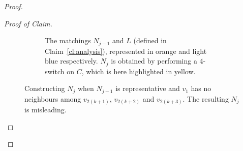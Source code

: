 \documentclass[11pt,a4paper]{article}
\theoremstyle{definition}
\newenvironment{poc}{\begin{proof}[Proof of
    Claim]\renewcommand*{\qedsymbol}{$\blacksquare$}}{\end{proof}}
\begin{document}
\begin{proof}
\begin{poc}
\begin{figure}[ht!]
\begin{subfigure}[t]{.5\linewidth}
        \caption{The matchings $N_{j-1}$ and $L$ (defined in Claim~\ref{cl:analysis}), represented in orange and
          light blue respectively. $N_j$ is obtained by performing a $4$-switch on
          $C$, which is here highlighted in yellow.}  
      \end{subfigure}
      \caption{Constructing $N_{j}$ when $N_{j-1}$ is representative and $v_1$ has no
        neighbours among $v_{2(k+1)}$, $v_{2(k+2)}$ and $v_{2(k+3)}$. The resulting $N_{j}$ is misleading.}\label{fig:FU}
    \end{figure}


\end{poc}
\end{proof}
\end{document}
